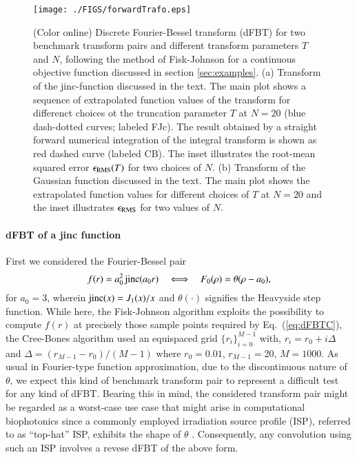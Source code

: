 \documentclass[review]{elsarticle}
\begin{document}
%
%
\begin{figure}[t!]
\centerline{\texttt{[image: ./FIGS/forwardTrafo.eps]} } 
\caption{(Color online)  Discrete Fourier-Bessel transform (dFBT) for two 
benchmark transform pairs and different transform parameters $T$ and $N$,
following the method of Fisk-Johnson for a continuous objective function
discussed in section \ref{sec:examples}.
(a) Transform of the {\rm jinc}-function discussed in the text. The main
plot shows a sequence of extrapolated function values of the transform for
differenct choices ot the truncation parameter $T$ at $N=20$ (blue dash-dotted
curves; labeled FJc). The result obtained by a straight forward numerical
integration of the integral transform is shown as red dashed curve (labeled
CB).  The inset illustrates the root-mean squared error $\epsilon_{\rm RMS}(T)$
for two choices of $N$. 
(b) Transform of the Gaussian function discussed in the text. The main
plot shows the extrapolated function values for different choices of $T$ at
$N=20$ and the inset illustrates $\epsilon_{\rm RMS}$ for two values of $N$.}
\label{fig:examples}
\end{figure}

\paragraph{dFBT of a {\rm jinc} function}
First we considered the Fourier-Bessel pair
\begin{equation}
f(r) = a_0^2 \,{\rm jinc}(a_0 r) \quad \Longleftrightarrow \quad 
F_0(\rho) = \theta(\rho-a_0),
\label{eq:FBP1}
\end{equation}
for $a_0=3$, wherein ${\rm jinc}(x)=J_1(x)/x$ and $\theta(\cdot)$ signifies the
Heavyside step function.  While here, the Fisk-Johnson algorithm exploits the
possibility to compute $f(r)$ at precisely those sample points required by
Eq.~(\ref{eq:dFBTC}), the Cree-Bones algorithm used an equispaced grid
$\{r_i\}_{i=0}^{M-1}$ with, $r_i=r_0+i\Delta$ and
$\Delta=(r_{M-1}-r_{0})/(M-1)$ where $r_0 = 0.01$, $r_{M-1}=20$, $M=1000$.  As
usual in Fourier-type function approximation, due to the discontinuous nature
of $\theta$, we expect this kind of benchmark transform pair to represent a
difficult test for any kind of dFBT.  Bearing this in mind, the considered
transform pair might be regarded as a worst-case use case that might arise in
computational biophotonics since a commonly employed irradiation source profile
(ISP), referred to as ``top-hat'' ISP, exhibits the shape of $\theta$
\cite{Paltauf:2000,CONV:1997}.  Consequently, any convolution using such an ISP
involves a revese dFBT of the above form.
\end{document}
